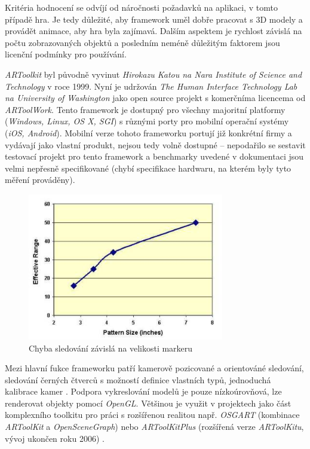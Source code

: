 \documentclass[twoside,12pt]{article}
\begin{document}
% 
\newpage 


Kritéria hodnocení se odvíjí od náročnosti požadavků na aplikaci, v tomto případě hra. Je tedy důležité, aby framework uměl dobře pracovat s 3D modely a provádět animace, aby hra byla zajímavá. Dalším aspektem je rychlost závislá na počtu zobrazovaných objektů a posledním neméně důležitým faktorem jsou licenční podmínky pro používání.


\textit{ARToolkit} byl původně vyvinut \textit{Hirokazu Katou na Nara Institute of Science and Technology} v roce 1999. Nyní je udržován \textit{The Human Interface Technology Lab na University of Washington} jako open source projekt s komerčníma licencema od \textit{ARToolWork}. Tento framework je dostupný pro všechny majoritní platformy (\textit{Windows, Linux, OS X, SGI}) s různými porty pro mobilní operační systémy (\textit{iOS, Android}). Mobilní verze tohoto frameworku portují již konkrétní firmy a vydávají jako vlastní produkt, nejsou tedy volně dostupné -- nepodařilo se sestavit testovací projekt pro tento framework a benchmarky uvedené v dokumentaci jsou velmi nepřesně specifikované (chybí specifikace hardwaru, na kterém byly tyto měření prováděny). 

\begin{figure}[H]
    \includegraphics[width=324px, center]{images/artoolkit_benchmark.jpg}
    \caption{Chyba sledování závislá na velikosti markeru}
    \label{artoolkit_benchmark}
\end{figure}

Mezi hlavní fukce frameworku patří kamerově pozicované a orientováné sledování, sledování černých čtverců s možností definice vlastních typů, jednoduchá kalibrace kamer \cite{artoolkit_features}. Podpora vykreslování modelů je pouze nízkoúrovňová, lze renderovat objekty pomocí \textit{OpenGL}. Většinou je využit v projektech jako část komplexního toolkitu pro práci s rozšířenou realitou např. \textit{OSGART} (kombinace \textit{ARToolKit} a \textit{OpenSceneGraph}) \cite{osgart} nebo \textit{ARToolKitPlus} (rozšířená verze \textit{ARToolKitu}, vývoj ukončen roku 2006) \cite{wagner_schmalstieg}. 
\end{document}
